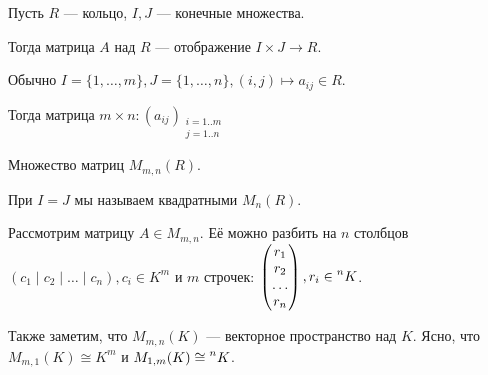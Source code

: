 \begin{definition}
    Пусть $R$ --- кольцо,  $I, J$ --- конечные множества.

    Тогда матрица $A$ над  $R$ --- отображение  $I \times J \to R$.

    Обычно  $I = \{1,\ldots, m\}, J = \{1, \ldots, n\}, (i, j) \mapsto a_{ij} \in R$.

    Тогда матрица $m \times n\!: (a_{ij})_{\substack{i=1..m \\ j = 1..n}}$
\end{definition}
\begin{definition}
    Множество матриц $M_{m, n}(R)$.

    При $I = J$ мы называем квадратными  $M_n(R)$.
\end{definition}

Рассмотрим матрицу $A \in M_{m, n}$. Её можно разбить на  $n$ столбцов  $(c_1 \mid c_2 \mid \ldots \mid c_n), c_i \in K^m$ и $m$ строчек:  $\begin{pmatrix} r_1 \\ r_2 \\ \ldots \\ r_n \end{pmatrix}, r_i \in \prescript{n}{}{K}$.

Также заметим, что $M_{m, n}(K)$ --- векторное пространство над  $K$. Ясно, что  $M_{m, 1}(K) \cong K^m$ и  $M_{1, m}(K) \cong \prescript{n}{}{K}$.

